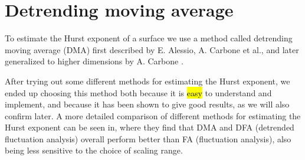 \section{Detrending moving average}
To estimate the Hurst exponent of a surface we use a method called detrending moving average (DMA) first described by E. Alessio, A. Carbone et al.\cite{alessio2002dma}, and later generalized to higher dimensions by A. Carbone \cite{carbone2007algorithm}. 

After trying out some different methods for estimating the Hurst exponent, we ended up choosing this method both because it is \hl{easy} to understand and implement, and because it has been shown to give good results, as we will also confirm later. A more detailed comparison of different methods for estimating the Hurst exponent can be seen in\cite{shao2012comparing}, where they find that DMA and DFA (detrended fluctuation analysis) overall perform better than FA (fluctuation analysis), also being less sensitive to the choice of scaling range.


